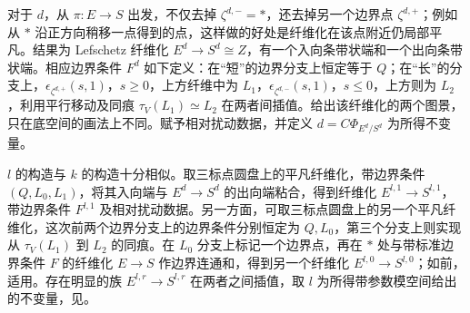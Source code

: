 对于 $d$，从 $\pi:E\to S$ 出发，不仅去掉 $\zeta^{d,-}=*$，还去掉另一个边界点 $\zeta^{d,+}$；例如从 $*$ 沿正方向稍移一点得到的点，这样做的好处是纤维化在该点附近仍局部平凡。结果为 Lefschetz 纤维化 $E^d\to S^d\cong Z$，有一个入向条带状端和一个出向条带状端。相应边界条件 $F^d$ 如下定义：在“短”的边界分支上恒定等于 $Q$；在“长”的分支上，$\epsilon_{\zeta^{d,+}}(s,1)$，$s\geq0$，上方纤维中为 $L_1$，$\epsilon_{\zeta^{d,-}}(s,1)$，$s\leq0$，上方则为 $L_2$，利用平行移动及同痕 $\tau_V(L_1)\simeq L_2$ 在两者间插值。给出该纤维化的两个图景，只在底空间的画法上不同。赋予相对扰动数据，并定义 $d=C\Phi_{E^d/S^d}$ 为所得不变量。

$l$ 的构造与 $k$ 的构造十分相似。取三标点圆盘上的平凡纤维化，带边界条件 $(Q,L_0,L_1)$，将其入向端与 $E^d\to S^d$ 的出向端粘合，得到纤维化 $E^{l,1}\to S^{l,1}$，带边界条件 $F^{l,1}$ 及相对扰动数据。另一方面，可取三标点圆盘上的另一个平凡纤维化，这次前两个边界分支上的边界条件分别恒定为 $Q,L_0$，第三个分支上则实现从 $\tau_V(L_1)$ 到 $L_2$ 的同痕。在 $L_0$ 分支上标记一个边界点，再在 $*$ 处与带标准边界条件 $F$ 的纤维化 $E\to S$ 作边界连通和，得到另一个纤维化 $E^{l,0}\to S^{l,0}$；如前，适用。存在明显的族 $E^{l,r}\to S^{l,r}$ 在两者之间插值，取 $l$ 为所得带参数模空间给出的不变量，见。
